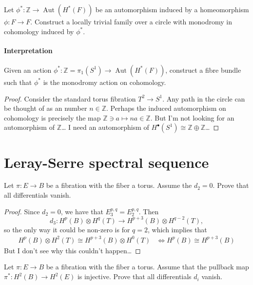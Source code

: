 \begin{manualexercise}{2.1}
	Let $ \phi^* :\mathbb{Z}\to \operatorname{Aut}(H^*(F))$ be an automorphism induced by a homeomorphism $\phi:F\to F$. Construct a locally trivial family over a circle with monodromy in cohomology induced by $\phi^*$. 
\end{manualexercise}

\paragraph{Interpretation} Given an action $\phi^*:\mathbb{Z}=\pi_{1}(S^1) \to \operatorname{Aut}(H^{*}(F))$, construct a fibre bundle such that $\phi^*$ is the monodromy action on cohomology.

\begin{proof}
	Consider the standard torus fibration $T^2\to S^1$. Any path in the circle can be thought of as an number $ n \in\mathbb{Z}$. Perhaps the induced automorphism on cohomology is precisely the map $\mathbb{Z}\ni a \mapsto na\in\mathbb{Z}$. But I'm not looking for an automorphism of $\mathbb{Z}$… I need an automorphism of $H^\bullet(S^1)\cong \mathbb{Z}\oplus \mathbb{Z}$…


\end{proof}

\section{Leray-Serre spectral sequence}

\begin{manualexercise}{2.4}
	Let $\pi:E\longrightarrow B$ be a fibration with the fiber a torus. Assume the $d_2=0$. Prove that all differentials vanish.
\end{manualexercise}

\begin{proof}
	Since $d_2=0$, we have that $E_3^{p,q}=E_2^{p,q}$. Then 
	\[d_3:H^{p}(B)\otimes H^{q}(T)\longrightarrow H^{p+3}(B)\otimes H^{q-2}(T),\] so the only way it could be non-zero is for $q=2$, which implies that 
	\begin{align*}
		H^p(B)\otimes H^{2}(T)\cong H^{p+3}(B)\otimes H^{0}(T)&\iff H^{p}(B)\cong H^{p+3}(B)
	\end{align*}
But I don't see why this couldn't happen…
\end{proof}

\begin{manualexercise}{2.5}
	Let $\pi:E\to B$ be a fibration with the fiber a torus. Assume that the pullback map $\pi^* :H^2(B)\to H^{2}(E)$ is injective. Prove that all differentials $d_i$ vanish.
\end{manualexercise}

